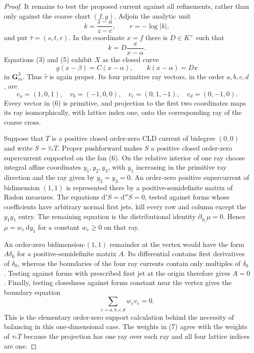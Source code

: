 \begin{proof}
It remains to test the proposed current against all refinements, rather
than only against the coarse chart $(f,g)$.  Adjoin the analytic unit
\[
                         k=\frac{z-a}{z-c},
                 \qquad r=-\log|k|,
\]
and put $\widehat\tau=(s,t,r)$.  In the coordinate $x=f$ there is
$D\in K^\times$ such that
\[
                         k=D\frac{x}{x-\alpha}.
\tag{5}
\]
Equations (3) and (5) exhibit $X$ as the closed curve
\[
 g(x-\beta)=C(x-\alpha),\qquad k(x-\alpha)=Dx
\]
in $\mathbf G_m^3$.  Thus $\widehat\tau$ is again proper.  Its four
primitive ray vectors, in the order $a,b,c,d$, are
\[
 v_a=(1,0,1),\quad v_b=(-1,0,0),\quad
 v_c=(0,1,-1),\quad v_d=(0,-1,0).
\tag{6}
\]
Every vector in (6) is primitive, and projection to the first two
coordinates maps its ray isomorphically, with lattice index one, onto the
corresponding ray of the coarse cross.

Suppose that $T$ is a positive closed order-zero CLD current of bidegree
$(0,0)$ and write $S=\widehat\tau_*T$.  Proper pushforward makes $S$ a
positive closed order-zero supercurrent supported on the fan (6).  On the
relative interior of one ray choose integral affine coordinates
$y_1,y_2,y_3$, with $y_1$ increasing in the primitive ray direction and
the ray given by $y_2=y_3=0$.  An order-zero positive supercurrent of
bidimension $(1,1)$ is represented there by a positive-semidefinite
matrix of Radon measures.  The equations $\mathrm d'S=\mathrm d''S=0$,
tested against forms whose coefficients have arbitrary normal first jets,
kill every row and column except the $y_1y_1$ entry.  The remaining
equation is the distributional identity $\partial_{y_1}\mu=0$.  Hence
$\mu=w_e\,\mathrm dy_1$ for a constant $w_e\geq0$ on that ray.

An order-zero bidimension-$(1,1)$ remainder at the vertex would have the
form $A\delta_0$ for a positive-semidefinite matrix $A$.  Its differential
contains first derivatives of $\delta_0$, whereas the boundaries of the
four ray currents contain only multiples of $\delta_0$.  Testing against
forms with prescribed first jet at the origin therefore gives $A=0$.
Finally, testing closedness against forms constant near the vertex gives
the boundary equation
\[
                         \sum_{e=a,b,c,d}w_ev_e=0.
\tag{7}
\]
This is the elementary order-zero support calculation behind the necessity
of balancing in this one-dimensional case.  The weights in (7) agree with
the weights of $\tau_*T$ because
the projection has one ray over each ray and all four lattice indices are
one.


\end{proof}
